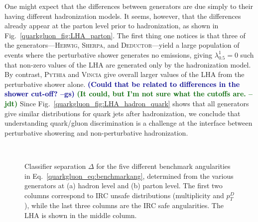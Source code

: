 \documentclass[11pt]{cernrep}
\newcommand{\jdt}[1]{\textbf{\textcolor{darkgreen}{(#1 --jdt)}}}
\newcommand{\gs}[1]{\textbf{\textcolor{darkblue}{(#1 --gs)}}}
\begin{document}
One might expect that the differences between generators are due
simply to their having different hadronization models.  It seems,
however, that the differences already appear at the parton level prior
to hadronization, as shown in Fig.~\ref{quarkgluon_fig:LHA_parton}.
The first thing one notices is that three of the
generators---\textsc{Herwig}, \textsc{Sherpa}, and
\textsc{Deductor}---yield a large population of events where the
perturbative shower generates no emissions, giving
$\lambda_{0.5}^1 = 0$ such that non-zero values of the LHA are
generated only by the hadronization model.  By contrast,
\textsc{Pythia} and \textsc{Vincia} give overall larger values of the
LHA from the perturbative shower alone. \gs{Could that be related to
  differences in the shower cut-off?} \jdt{It could, but I'm not sure what the cutoffs are.}  Since
Fig.~\ref{quarkgluon_fig:LHA_hadron_quark} shows that all generators
give similar distributions for quark jets after hadronization, we
conclude that understanding quark/gluon discrimination is a challenge
at the interface between perturbative showering and non-perturbative
hadronization.

\begin{figure}
\centering
{}
$\qquad$
\caption{Classifier separation $\Delta$ for the five different benchmark angularities in Eq.~\eqref{quarkgluon_eq:benchmarkang}, determined from the various generators at (a) hadron level and (b) parton level.  The first two columns correspond to IRC unsafe distributions (multiplicity and $p_T^D$), while the last three columns are the IRC safe angularities.  The LHA is shown in the middle column.}
\label{quarkgluon_fig:summary_all}
\end{figure}
\end{document}
